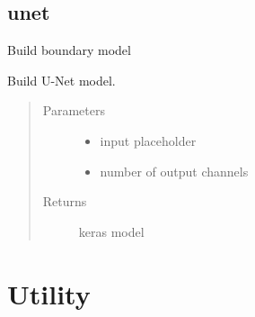 \documentclass[letterpaper,10pt,english]{sphinxmanual}
\begin{document}
\section{unet}
\label{\detokenize{index:module-boundary.boundary}}\label{\detokenize{index:unet}}
Build boundary model

\begin{fulllineitems}
\label{\detokenize{index:boundary.boundary.boundary_model}}
Build U-Net model.
\begin{quote}\begin{description}
\item[{Parameters}] \leavevmode\begin{itemize}
\item {} 
 \textendash{} input placeholder

\item {} 
 \textendash{} number of output channels

\end{itemize}

\item[{Returns}] \leavevmode
keras model

\end{description}\end{quote}

\end{fulllineitems}



\chapter{Utility}
\label{\detokenize{index:utility}}
\end{document}
